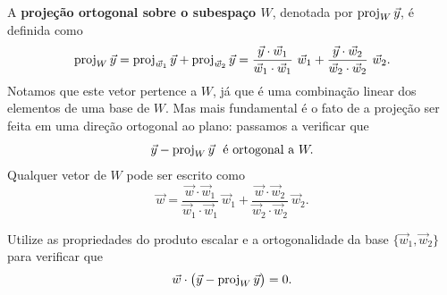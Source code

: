 A \textbf{projeção ortogonal sobre o subespaço $W$}, denotada por $\operatorname{proj}_W \vec{y}$, é definida como
\begin{equation}
\operatorname{proj}_W \vec{y} = \operatorname{proj}_{\vec{w}_1} \vec{y} + \operatorname{proj}_{\vec{w}_2} \vec{y} = \frac{\vec{y} \cdot \vec{w}_1}{\vec{w}_1 \cdot \vec{w}_1} \ \vec{w}_1 + \frac{\vec{y} \cdot \vec{w}_2}{\vec{w}_2 \cdot \vec{w}_2} \ \vec{w}_2.
\end{equation} Notamos que este vetor pertence a $W$, já que é uma combinação linear dos elementos de uma base de $W$. Mas mais fundamental é o fato de a projeção ser feita em uma direção ortogonal ao plano: passamos a verificar que
\begin{equation}
\vec{y} - \operatorname{proj}_W \vec{y} \ \text{ é ortogonal a }  W.
\end{equation} Qualquer vetor de $W$ pode ser escrito como
\begin{equation}
\vec{w} = \frac{\vec{w} \cdot \vec{w}_1}{\vec{w}_1 \cdot \vec{w}_1} \ \vec{w}_1 + \frac{\vec{w} \cdot \vec{w}_2}{\vec{w}_2 \cdot \vec{w}_2} \ \vec{w}_2.
\end{equation}

\begin{exer}\label{exercise:proj}
Utilize as propriedades do produto escalar e a ortogonalidade da base $\{\vec{w}_1, \vec{w}_2\}$ para verificar que
\begin{equation}
\vec{w} \cdot  \big( \vec{y} - \operatorname{proj}_W \vec{y} \big) = 0.
\end{equation}
\end{exer}

